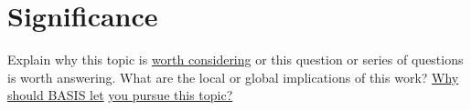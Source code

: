 
\section[Significance]{Significance}

Explain why this topic is \underline{worth considering} or this question or series of questions is worth answering. What are the local or global implications of this work? \underline{Why should BASIS let} \underline{you pursue this topic?}